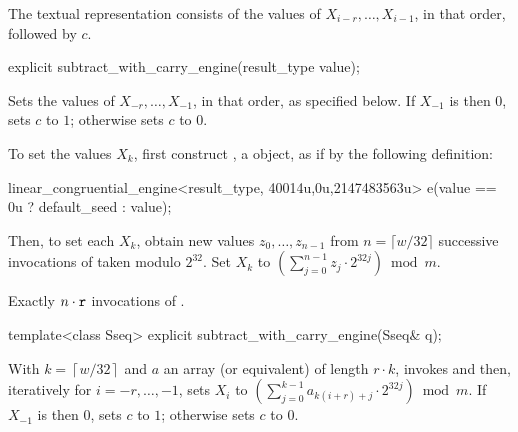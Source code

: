 \pnum
The textual representation%
%
consists of the values of
 $X_{i-r}, \dotsc, X_{i-1}$,
in that order, followed by $c$.

%
\begin{itemdecl}
explicit subtract_with_carry_engine(result_type value);
\end{itemdecl}

\begin{itemdescr}
\pnum
\effects
 Sets the values of
 $X_{-r}, \dotsc, X_{-1}$,
 in that order, as specified below.
 If $X_{-1}$ is then $0$,
 sets $c$ to $1$;
 otherwise sets $c$ to $0$.

 To set the values $X_k$,
 first construct , a  object,
 as if by the following definition:
\begin{codeblock}
linear_congruential_engine<result_type,
                          40014u,0u,2147483563u> e(value == 0u ? default_seed : value);
\end{codeblock}
 Then, to set each $X_k$,
 obtain new values $z_0, \dotsc, z_{n-1}$
 from $n = \lceil w/32 \rceil$ successive invocations
 of  taken modulo $2^{32}$.
 Set $X_k$ to $\left( \sum_{j=0}^{n-1} z_j \cdot 2^{32j}\right) \bmod m$.

\pnum
\complexity
Exactly $n \cdot \texttt{r}$ invocations
 of .
\end{itemdescr}

%
\begin{itemdecl}
template<class Sseq> explicit subtract_with_carry_engine(Sseq& q);
\end{itemdecl}

\begin{itemdescr}
\pnum
\effects
 With
 $k = \left\lceil w / 32 \right\rceil$
 and $a$ an array (or equivalent)
 of length $r \cdot k$,
 invokes 
 and then, iteratively for $i = -r, \dotsc, -1$,
 sets $X_i$
 to $ \left(\sum_{j=0}^{k-1}a_{k(i+r)+j} \cdot 2^{32j} \right) \bmod m $.
 If $X_{-1}$ is then $0$,
 sets $c$ to $1$;
 otherwise sets $c$ to $0$.
\end{itemdescr}




